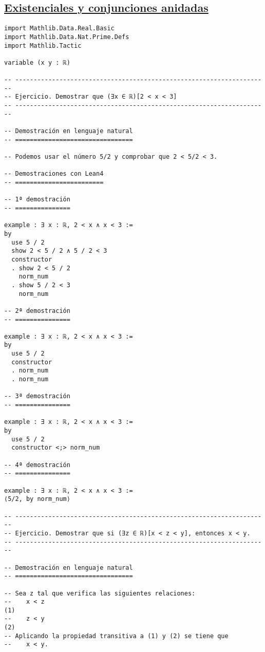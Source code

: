 \subsection{\href{./src/Logica/Existenciales\_y\_conjunciones\_anidadas.lean}{Existenciales y conjunciones anidadas}}
\label{sec:orga243699}
\begin{verbatim}
import Mathlib.Data.Real.Basic
import Mathlib.Data.Nat.Prime.Defs
import Mathlib.Tactic

variable (x y : ℝ)

-- ---------------------------------------------------------------------
-- Ejercicio. Demostrar que (∃x ∈ ℝ)[2 < x < 3]
-- ---------------------------------------------------------------------

-- Demostración en lenguaje natural
-- ================================

-- Podemos usar el número 5/2 y comprobar que 2 < 5/2 < 3.

-- Demostraciones con Lean4
-- ========================

-- 1ª demostración
-- ===============

example : ∃ x : ℝ, 2 < x ∧ x < 3 :=
by
  use 5 / 2
  show 2 < 5 / 2 ∧ 5 / 2 < 3
  constructor
  . show 2 < 5 / 2
    norm_num
  . show 5 / 2 < 3
    norm_num

-- 2ª demostración
-- ===============

example : ∃ x : ℝ, 2 < x ∧ x < 3 :=
by
  use 5 / 2
  constructor
  . norm_num
  . norm_num

-- 3ª demostración
-- ===============

example : ∃ x : ℝ, 2 < x ∧ x < 3 :=
by
  use 5 / 2
  constructor <;> norm_num

-- 4ª demostración
-- ===============

example : ∃ x : ℝ, 2 < x ∧ x < 3 :=
⟨5/2, by norm_num⟩

-- ---------------------------------------------------------------------
-- Ejercicio. Demostrar que si (∃z ∈ ℝ)[x < z < y], entonces x < y.
-- ---------------------------------------------------------------------

-- Demostración en lenguaje natural
-- ================================

-- Sea z tal que verifica las siguientes relaciones:
--    x < z                                                          (1)
--    z < y                                                          (2)
-- Aplicando la propiedad transitiva a (1) y (2) se tiene que
--    x < y.


\end{verbatim}
